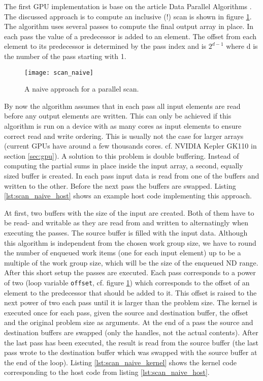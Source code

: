 The first GPU implementation is base on the article Data Parallel Algorithms \cite{scan_naive}. The discussed approach is to compute an inclusive (!) scan is shown in figure \ref{fig:scan_naive}. The algorithm uses several passes to compute the final output array in place. In each pass the value of a predecessor is added to an element. The offset from each element to its predecessor is determined by the pass index and is $2^{d - 1}$ where d is the number of the pass starting with 1.

\begin{figure}[h]
\centering
\texttt{[image: scan\_naive]}
\caption{A naive approach for a parallel scan. \cite{gpu_gems_3_chapter_39}}
\label{fig:scan_naive}
\end{figure}

By now the algorithm assumes that in each pass all input elements are read before any output elements are written. This can only be achieved if this algorithm is run on a device with as many cores as input elements to ensure correct read and write ordering. This is usually not the case for larger arrays (current GPUs have around a few thousands cores. cf. NVIDIA Kepler GK110 in section \ref{sec:gpu}). A solution to this problem is double buffering. Instead of computing the partial sums in place inside the input array, a second, equally sized buffer is created. In each pass input data is read from one of the buffers and written to the other. Before the next pass the buffers are swapped.
Listing \ref{lst:scan_naive_host} shows an example host code implementing this approach.



At first, two buffers with the size of the input are created. Both of them have to be read- and writable as they are read from and written to alternatingly when executing the passes. The source buffer is filled with the input data. Although this algorithm is independent from the chosen work group size, we have to round the number of enqueued work items (one for each input element) up to be a multiple of the work group size, which will be the size of the enqueued ND range. After this short setup the passes are executed. Each pass corresponds to a power of two (loop variable \lstinline!offset!, cf. figure \ref{fig:scan_naive}) which corresponds to the offset of an element to the predecessor that should be added to it. This offset is raised to the next power of two each pass until it is larger than the problem size. The kernel is executed once for each pass, given the source and destination buffer, the offset and the original problem size as arguments. At the end of a pass the source and destination buffers are swapped (only the handles, not the actual contents). After the last pass has been executed, the result is read from the source buffer (the last pass wrote to the destination buffer which was swapped with the source buffer at the end of the loop).
Listing \ref{lst:scan_naive_kernel} shows the kernel code corresponding to the host code from listing \ref{lst:scan_naive_host}.

